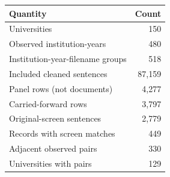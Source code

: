 \begin{tabular}{lr}
\toprule
Quantity & Count \\
\midrule
Universities & 150 \\
Observed institution-years & 480 \\
Institution-year-filename groups & 518 \\
Included cleaned sentences & 87,159 \\
Panel rows (not documents) & 4,277 \\
Carried-forward rows & 3,797 \\
Original-screen sentences & 2,779 \\
Records with screen matches & 449 \\
Adjacent observed pairs & 330 \\
Universities with pairs & 129 \\
\bottomrule
\end{tabular}
